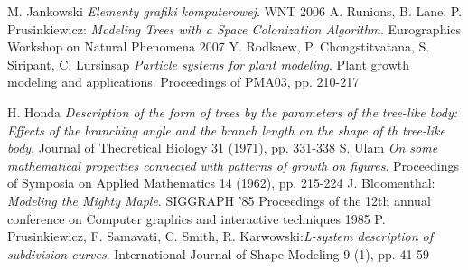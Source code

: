 \documentclass[a4paper,12pt]{report}
\begin{document}








\begin{thebibliography}{1}
 M. Jankowski  \emph{Elementy grafiki komputerowej}. WNT 2006
 A. Runions, B. Lane, P. Prusinkiewicz: \emph{Modeling Trees with a Space Colonization Algorithm}.
Eurographics Workshop on Natural Phenomena 2007
 Y. Rodkaew, P. Chongstitvatana, S. Siripant, C. Lursinsap \emph{Particle systems for plant modeling}. Plant growth modeling and applications. Proceedings of PMA03, pp. 210-217

 H. Honda \emph{Description of the form of trees by the parameters of the tree-like body: Effects of the branching angle and the branch length on the shape of th tree-like body}. Journal of Theoretical Biology 31 (1971), pp. 331-338
 S. Ulam \emph{On some mathematical properties connected with patterns of growth on figures}. Proceedings of Symposia on Applied Mathematics 14 (1962), pp. 215-224
J. Bloomenthal: \emph{Modeling the Mighty Maple}. SIGGRAPH '85 Proceedings of the 12th annual conference on Computer graphics and interactive techniques 1985
 P. Prusinkiewicz, F. Samavati, C. Smith, R. Karwowski:\emph{L-system description of subdivision curves}. International Journal of Shape Modeling 9 (1), pp. 41-59
\end{thebibliography}
\end{document}
